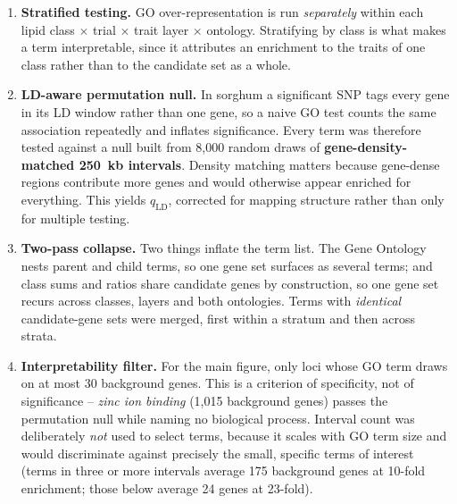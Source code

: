 \documentclass[11pt]{article}
\newcommand{\lead}[1]{\textbf{#1}}
\begin{document}
\begin{enumerate}[leftmargin=1.4em, itemsep=3pt]
  \item \lead{Stratified testing.} GO over-representation is run \emph{separately}
        within each lipid class $\times$ trial $\times$ trait layer $\times$
        ontology. Stratifying by class is what makes a term interpretable, since
        it attributes an enrichment to the traits of one class rather than to the
        candidate set as a whole.
  \item \lead{LD-aware permutation null.} In sorghum a significant SNP tags every
        gene in its LD window rather than one gene, so a naive GO test counts the
        same association repeatedly and inflates significance. Every term was
        therefore tested against a null built from 8{,}000 random draws of
        \textbf{gene-density-matched 250~kb intervals}. Density matching matters
        because gene-dense regions contribute more genes and would otherwise
        appear enriched for everything. This yields $q_{\mathrm{LD}}$, corrected
        for mapping structure rather than only for multiple testing.
  \item \lead{Two-pass collapse.} Two things inflate the term list. The Gene
        Ontology nests parent and child terms, so one gene set surfaces as several
        terms; and class sums and ratios share candidate genes by construction, so
        one gene set recurs across classes, layers and both ontologies. Terms with
        \emph{identical} candidate-gene sets were merged, first within a stratum
        and then across strata.
  \item \lead{Interpretability filter.} For the main figure, only loci whose GO
        term draws on at most 30 background genes. This is a criterion of
        specificity, not of significance -- \emph{zinc ion binding}
        (1{,}015 background genes) passes the permutation null while naming no
        biological process. Interval count was deliberately \emph{not} used to
        select terms, because it scales with GO term size and would discriminate
        against precisely the small, specific terms of interest (terms in three or
        more intervals average 175 background genes at 10-fold enrichment; those
        below average 24 genes at 23-fold).
\end{enumerate}
\end{document}
